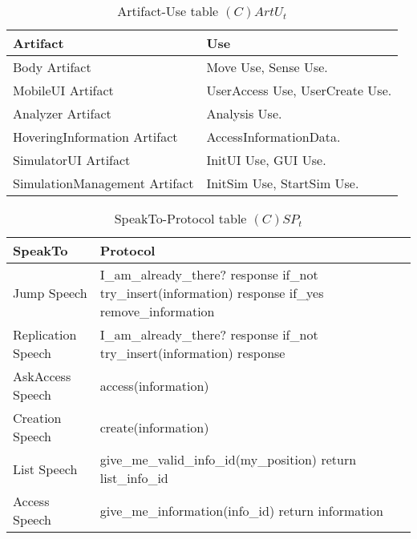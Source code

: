 \begin{table}[H]
	\centering
	\begin{tabular}{|p{4cm}|p{8cm}|}
			\hline
			\textbf{Artifact} & \textbf{Use} \\
			\hline
			Body Artifact & Move Use, Sense Use. \\
			\hline
			MobileUI Artifact & UserAccess Use, UserCreate Use. \\
			\hline
			Analyzer Artifact & Analysis Use. \\
			\hline
			HoveringInformation Artifact & AccessInformationData. \\
			\hline
			SimulatorUI Artifact & InitUI Use, GUI Use. \\
			\hline
			SimulationManagement Artifact & InitSim Use, StartSim Use. \\
			\hline
		\end{tabular}
	\caption{Artifact-Use table $(C)ArtU_t$}
	\label{tab:cartut}
\end{table}

\begin{table}[H]
	\centering
	\begin{tabular}{|p{4cm}|p{8cm}|}
			\hline
			\textbf{SpeakTo} & \textbf{Protocol} \\
			\hline
			Jump Speech & I\_am\_already\_there? \newline response \newline if\_not
			try\_insert(information) \newline response \newline if\_yes remove\_information \\
			\hline
			Replication Speech & I\_am\_already\_there? \newline response \newline if\_not
			try\_insert(information) \newline response \\
			\hline
			AskAccess Speech & access(information) \\
			\hline
			Creation Speech & create(information) \\
			\hline
			List Speech & give\_me\_valid\_info\_id(my\_position) \newline return list\_info\_id\\
			\hline
			Access Speech & give\_me\_information(info\_id) \newline return information \\
			\hline
		\end{tabular}
	\caption{SpeakTo-Protocol table $(C)SP_t$}
	\label{tab:cspt}
\end{table}

